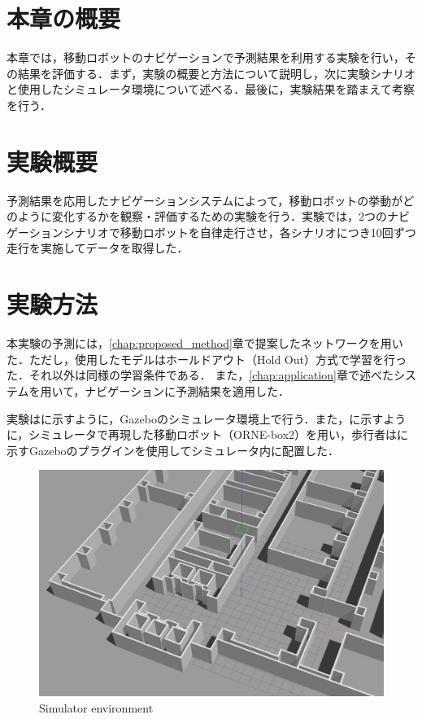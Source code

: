 

\section{本章の概要}
本章では，移動ロボットのナビゲーションで予測結果を利用する実験を行い，その結果を評価する．まず，実験の概要と方法について説明し，次に実験シナリオと使用したシミュレータ環境について述べる．最後に，実験結果を踏まえて考察を行う．

\section{実験概要}
予測結果を応用したナビゲーションシステムによって，移動ロボットの挙動がどのように変化するかを観察・評価するための実験を行う．実験では，2つのナビゲーションシナリオで移動ロボットを自律走行させ，各シナリオにつき10回ずつ走行を実施してデータを取得した．

\section{実験方法}
本実験の予測には，\ref{chap:proposed_method}章で提案したネットワークを用いた．ただし，使用したモデルはホールドアウト（Hold Out）方式で学習を行った．それ以外は同様の学習条件である．
また，\ref{chap:application}章で述べたシステムを用いて，ナビゲーションに予測結果を適用した．

実験はに示すように，Gazebo\cite{Gazebo62:online}のシミュレータ環境上で行う．また，に示すように，シミュレータで再現した移動ロボット（ORNE-box2\cite{井口颯人2023屋外自律移動ロボットプラットフォーム-orne}）を用い，歩行者はに示すGazeboのプラグイン\cite{Actors-G87:online}を使用してシミュレータ内に配置した．

\begin{figure}[H]
  \centering
 \includegraphics[keepaspectratio, scale=0.15]
      {images/sim-env.png}
\caption{Simulator environment}
 \label{Fig:sim-env}
\end{figure} 

